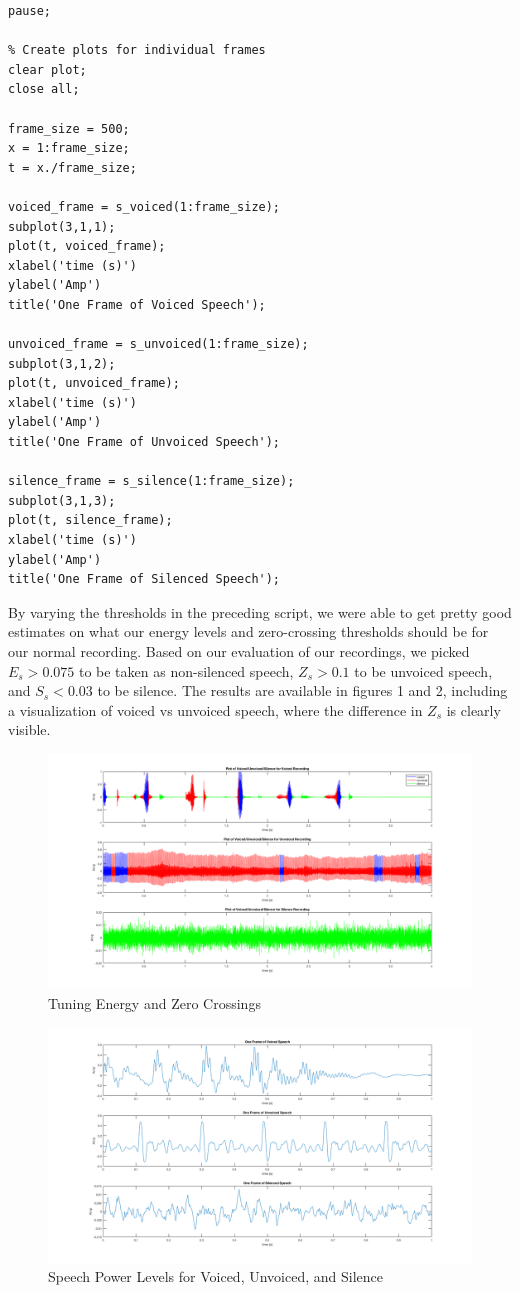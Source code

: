 \documentclass[11pt]{article}
\begin{document}
\begin{lstlisting}
pause;

% Create plots for individual frames
clear plot;
close all;

frame_size = 500;
x = 1:frame_size;
t = x./frame_size;

voiced_frame = s_voiced(1:frame_size);
subplot(3,1,1);
plot(t, voiced_frame);
xlabel('time (s)')
ylabel('Amp')
title('One Frame of Voiced Speech');

unvoiced_frame = s_unvoiced(1:frame_size);
subplot(3,1,2);
plot(t, unvoiced_frame);
xlabel('time (s)')
ylabel('Amp')
title('One Frame of Unvoiced Speech');

silence_frame = s_silence(1:frame_size);
subplot(3,1,3);
plot(t, silence_frame);
xlabel('time (s)')
ylabel('Amp')
title('One Frame of Silenced Speech');
\end{lstlisting}
By varying the thresholds in the preceding script, we were able to get pretty good estimates on what our energy levels and zero-crossing thresholds should be for our normal recording. Based on our evaluation of our recordings, we picked $E_s > 0.075$ to be taken as non-silenced speech, $Z_s > 0.1$ to be unvoiced speech, and $S_s < 0.03$ to be silence. The results are available in figures 1 and 2, including a visualization of voiced vs unvoiced speech, where the difference in $Z_s$ is clearly visible.

\begin{figure}[H]
  \centering
  \includegraphics[scale=.25]{speech_tuning_part1.png}
  \caption{Tuning Energy and Zero Crossings}
\end{figure}

\begin{figure}[H]
  \centering
  \includegraphics[scale=.25]{speech_tuning_figures.png}
  \caption{Speech Power Levels for Voiced, Unvoiced, and Silence}
\end{figure}
\end{document}
